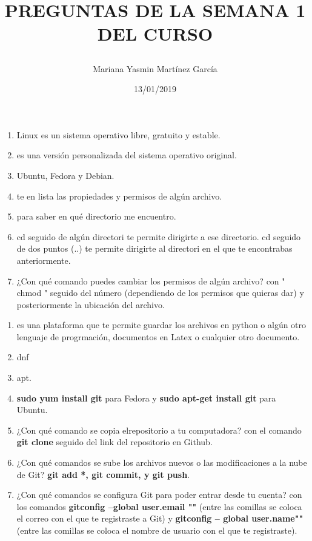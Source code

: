 \documentclass[letterpaper, 12pt, twoside]{article}
\title{\Huge\item\color{red}\textbf {PREGUNTAS DE LA SEMANA 1 DEL CURSO}}
\author{Mariana Yasmin Martínez García}
\date{13/01/2019}
\begin{document}
	\maketitle
	
	\newpage
	\title{\Large\color{red}}
	\begin{enumerate}
		\item{} Linux es un sistema operativo libre, gratuito y estable.
		\item{} es una versión personalizada del sistema operativo original.
		\item{} Ubuntu, Fedora y Debian.
		\item{} te en lista las propiedades y permisos de algún archivo.
		\item{}para saber en qué directorio me encuentro.
		\item{} cd seguido de algún directori te permite dirigirte a ese directorio. cd seguido de dos puntos (..) te permite dirigirte al directori en el que te encontrabas anteriormente.
		\item{\Large ¿Con qué comando puedes cambiar los permisos de algún archivo?} con " chmod " seguido del número (dependiendo de los permisos que quieras dar) y posteriormente la ubicación del archivo.
	\end{enumerate}

    \title{\Large\color{red}} 
    \begin{enumerate}
        \item{} es una plataforma que te permite guardar los archivos en python o algún otro lenguaje de progrmación, documentos en Latex o cualquier otro documento.
        \item{} dnf
        \item{} apt.
        \item{} \textbf{sudo yum install git} para Fedora y \textbf{sudo apt-get install git} para Ubuntu.
        \item{\large ¿Con qué comando se copia elrepositorio a tu computadora?} con el comando \textbf{git clone} seguido del link del repositorio en Github.
        \item{\Large ¿Con qué comandos se sube los archivos nuevos o las modificaciones a la nube de Git?} \textbf{git add *, git commit, y git push}.
        \item{\Large ¿Con qué comandos se configura Git para poder entrar desde tu cuenta?} con los comandos \textbf{gitconfig --global user.email ""} (entre las comillas se coloca el correo con el que te registraste a Git) y \textbf{gitconfig -- global user.name""} (entre las comillas se coloca el nombre de usuario con el que te registraste).
          
    \end{enumerate}
\end{document}
